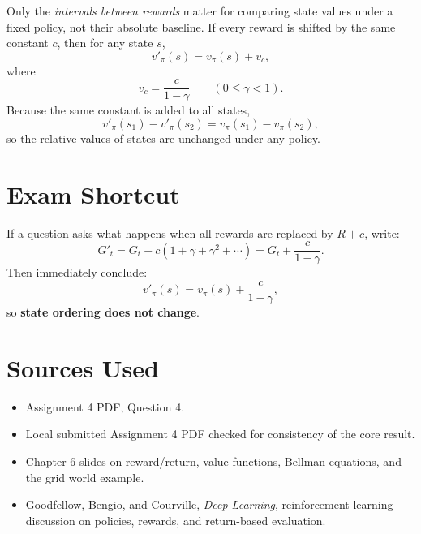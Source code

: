 \documentclass[11pt]{article}
\begin{document}
Only the \emph{intervals between rewards} matter for comparing state values under
a fixed policy, not their absolute baseline. If every reward is shifted by the
same constant \(c\), then for any state \(s\),
\[
    v'_\pi(s) = v_\pi(s) + v_c,
\]
where
\[
    \boxed{v_c = \frac{c}{1-\gamma}} \qquad (0 \le \gamma < 1).
\]
Because the same constant is added to all states,
\[
    v'_\pi(s_1) - v'_\pi(s_2) = v_\pi(s_1) - v_\pi(s_2),
\]
so the relative values of states are unchanged under any policy.

\section*{Exam Shortcut}

If a question asks what happens when all rewards are replaced by \(R+c\), write:
\[
    G'_t = G_t + c(1+\gamma+\gamma^2+\cdots)
         = G_t + \frac{c}{1-\gamma}.
\]
Then immediately conclude:
\[
    v'_\pi(s) = v_\pi(s) + \frac{c}{1-\gamma},
\]
so \textbf{state ordering does not change}.

\section*{Sources Used}

\begin{itemize}
    \item Assignment 4 PDF, Question 4.
    \item Local submitted Assignment 4 PDF checked for consistency of the core
    result.
    \item Chapter 6 slides on reward/return, value functions, Bellman equations,
    and the grid world example.
    \item Goodfellow, Bengio, and Courville, \emph{Deep Learning}, reinforcement-learning discussion on policies, rewards, and return-based evaluation.
\end{itemize}
\end{document}
